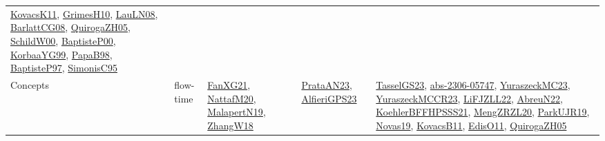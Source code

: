 {\begin{longtable}{lp{3cm}>{\raggedright}p{6cm}>{\raggedright}p{6cm}p{8cm}}
\href{articles/KovacsK11.pdf}{KovacsK11}\cite{KovacsK11}, \href{papers/GrimesH10.pdf}{GrimesH10}\cite{GrimesH10}, \href{papers/LauLN08.pdf}{LauLN08}\cite{LauLN08}, \href{papers/BarlattCG08.pdf}{BarlattCG08}\cite{BarlattCG08}, \href{papers/QuirogaZH05.pdf}{QuirogaZH05}\cite{QuirogaZH05}, \href{articles/SchildW00.pdf}{SchildW00}\cite{SchildW00}, \href{articles/BaptisteP00.pdf}{BaptisteP00}\cite{BaptisteP00}, \href{papers/KorbaaYG99.pdf}{KorbaaYG99}\cite{KorbaaYG99}, \href{articles/PapaB98.pdf}{PapaB98}\cite{PapaB98}, \href{papers/BaptisteP97.pdf}{BaptisteP97}\cite{BaptisteP97}, \href{papers/SimonisC95.pdf}{SimonisC95}\cite{SimonisC95}\\
Concepts & flow-time & \href{articles/FanXG21.pdf}{FanXG21}\cite{FanXG21}, \href{papers/NattafM20.pdf}{NattafM20}\cite{NattafM20}, \href{papers/MalapertN19.pdf}{MalapertN19}\cite{MalapertN19}, \href{articles/ZhangW18.pdf}{ZhangW18}\cite{ZhangW18} & \href{articles/PrataAN23.pdf}{PrataAN23}\cite{PrataAN23}, \href{articles/AlfieriGPS23.pdf}{AlfieriGPS23}\cite{AlfieriGPS23} & \href{papers/TasselGS23.pdf}{TasselGS23}\cite{TasselGS23}, \href{articles/abs-2306-05747.pdf}{abs-2306-05747}\cite{abs-2306-05747}, \href{papers/YuraszeckMC23.pdf}{YuraszeckMC23}\cite{YuraszeckMC23}, \href{articles/YuraszeckMCCR23.pdf}{YuraszeckMCCR23}\cite{YuraszeckMCCR23}, \href{papers/LiFJZLL22.pdf}{LiFJZLL22}\cite{LiFJZLL22}, \href{articles/AbreuN22.pdf}{AbreuN22}\cite{AbreuN22}, \href{articles/KoehlerBFFHPSSS21.pdf}{KoehlerBFFHPSSS21}\cite{KoehlerBFFHPSSS21}, \href{articles/MengZRZL20.pdf}{MengZRZL20}\cite{MengZRZL20}, \href{papers/ParkUJR19.pdf}{ParkUJR19}\cite{ParkUJR19}, \href{articles/Novas19.pdf}{Novas19}\cite{Novas19}, \href{articles/KovacsB11.pdf}{KovacsB11}\cite{KovacsB11}, \href{papers/EdisO11.pdf}{EdisO11}\cite{EdisO11}, \href{papers/QuirogaZH05.pdf}{QuirogaZH05}\cite{QuirogaZH05}\\

\end{longtable}}
